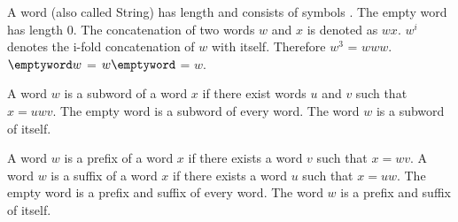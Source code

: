     A word \word (also called String) has length \length and consists of symbols \symbol \elem \sigmaS.\newline
    The empty word \emptyword has length 0.\newline
    The concatenation of two words $w$ and $x$ is denoted as $wx$.\newline
    $w^i$ denotes the i-fold concatenation of $w$ with itself. Therefore $w^3$ = $www$.\newline
    $\emptyword w$ = $w \emptyword$ = $w$.\newline

    A word $w$ is a subword of a word $x$ if there exist words $u$ and $v$ such that $x = uwv$.\newline
    The empty word is a subword of every word.\newline
    The word $w$ is a subword of itself.\newline

    A word $w$ is a prefix of a word $x$ if there exists a word $v$ such that $x = wv$.\newline
    A word $w$ is a suffix of a word $x$ if there exists a word $u$ such that $x = uw$.\newline
    The empty word is a prefix and suffix of every word.\newline
    The word $w$ is a prefix and suffix of itself.\newline